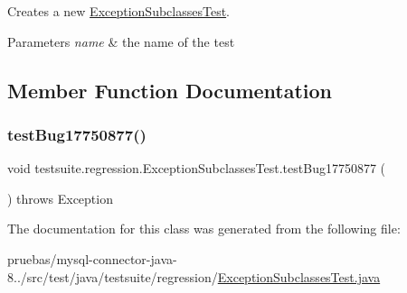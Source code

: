 Creates a new \mbox{\hyperlink{classtestsuite_1_1regression_1_1_exception_subclasses_test}{Exception\+Subclasses\+Test}}.


\begin{DoxyParams}{Parameters}
{\em name} & the name of the test \\
\hline
\end{DoxyParams}


\subsection{Member Function Documentation}
\mbox{\label{classtestsuite_1_1regression_1_1_exception_subclasses_test_a2eb17ba3714d3c08bb6403410dc77880}} 
\subsubsection{\texorpdfstring{test\+Bug17750877()}{testBug17750877()}}
{\footnotesize\ttfamily void testsuite.\+regression.\+Exception\+Subclasses\+Test.\+test\+Bug17750877 (\begin{DoxyParamCaption}{ }\end{DoxyParamCaption}) throws Exception}



The documentation for this class was generated from the following file\+:\begin{DoxyCompactItemize}
\item 
pruebas/mysql-\/connector-\/java-\/8../src/test/java/testsuite/regression/\mbox{\hyperlink{_exception_subclasses_test_8java}{Exception\+Subclasses\+Test.\+java}}\end{DoxyCompactItemize}
